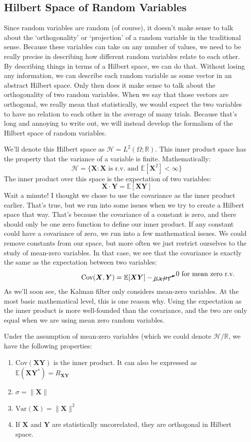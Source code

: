 \subsection{Hilbert Space of Random Variables}
Since random variables are random (of course), it doesn't make sense to talk about the `orthogonality' or `projection' of a random variable in the traditional sense. Because these variables can take on any number of values, we need to be really precise in describing how different random variables relate to each other. By describing things in terms of a Hilbert space, we can do that. Without losing any information, we can describe each random variable as some vector in an abstract Hilbert space. Only then does it make sense to talk about the orthogonality of two random variables. When we say that those vectors are orthogonal, we really mean that statistically, we would expect the two variables to have no relation to each other in the average of many trials. Because that's long and annoying to write out, we will instead develop the formalism of the Hilbert space of random variables.

We'll denote this Hilbert space as $\mathcal{H}=L^2(\Omega;\mathbb{R})$. This inner product space has the property that the variance of a variable is finite. Mathematically:
$$\mathcal{H}=\{\bm{X}:\bm{X} \text{ is r.v. and } \mathbb{E}\left[\bm{X}^2\right]<\infty\}$$
The inner product over this space is the expectation of two 
variables:
$$\bm{X}\cdot \bm{Y}=\mathbb{E}[\bm{XY}]$$
Wait a minute! I thought we chose to use the covariance as the inner product earlier. That's true, but we run into some issues when we try to create a Hilbert space that way. That's because the covariance of a constant is zero, and there should only be one zero function to define our inner product. If any constant could have a covariance of zero, we run into a few mathematical issues. We could remove constants from our space, but more often we just restrict ourselves to the study of mean-zero variables. In that case, we see that the covariance is exactly the same as the expectation between two variables:
$$\text{Cov}(\bm{X},\bm{Y})=\mathbb{E}[\bm{XY}]-\cancelto{0 \text{ for mean zero r.v.}}{\mu_X\mu_Y}$$
As we'll soon see, the Kalman filter only considers mean-zero variables. At the most basic mathematical level, this is one reason why. Using the expectation as the inner product is more well-founded than the covariance, and the two are only equal when we are using mean zero random variables.

Under the assumption of mean-zero variables (which we could denote $\mathcal{H}/\mathbb{R}$, we have the following properties:
\begin{enumerate}
    \item $\text{Cov}(\bm{XY})$ is the inner product. It can also be expressed as $\mathbb{E}(\bm{XY}^*)=R_{\bm{XY}}$
    \item $\sigma=\|\bm{X}\|$
    \item $\text{Var}(\bm{X})=\|\bm{X}\|^2$
    \item If $\bm{X}$ and $\bm{Y}$ are statistically uncorrelated, they are orthogonal in Hilbert space.
\end{enumerate}

